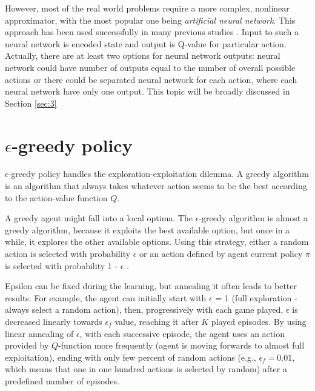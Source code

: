             However, most of the real world problems require a more complex, nonlinear approximator, with the most popular one being \textit{artificial neural network}. This approach has been used successfully in many previous studies \cite{bingqiang} \cite{Dini12combiningq-learning}\cite{touzet}. Input to such a neural network is encoded state and output is Q-value for particular action. Actually, there are at least two options for neural network outputs: neural network could have number of outputs equal to the number of overall possible actions or there could be separated neural network for each action, where each neural network have only one output. This topic will be broadly discussed in Section \ref{sec:3}
            
            
            
            \section{$\epsilon$-greedy policy} \label{section:26}
                $\epsilon$-greedy policy handles the exploration-exploitation dilemma. A greedy algorithm is an algorithm
            that always takes whatever action seems to be the best according to the action-value function $Q$.
            \par
            A greedy agent might fall into a local optima. The $\epsilon$-greedy algorithm is almost a greedy algorithm,
            because it exploits the best available option, but once in a while, it explores the other available
            options. Using this strategy, either a random action is selected with probability $\epsilon$ or an action
            defined by agent current policy $\pi$ is selected with probability 1 - $\epsilon$ .
            \par
             Epsilon can be fixed during the learning, but annealing it often leads to better results. For
            example, the agent can initially start with $\epsilon$ = 1 (full exploration - always select a random action),
            then, progressively with each game played, $\epsilon$ is decreased linearly towards $\epsilon_f$ value, reaching it
            after $K$ played episodes. By using linear annealing of $\epsilon$, with each successive episode, the agent
            uses an action provided by $Q$-function more frequently (agent is moving forwards to almost full
            exploitation), ending with only few percent of random actions (e.g., $\epsilon_f = 0.01$, which means that
            one in one hundred actions is selected by random) after a predefined number of episodes.
            